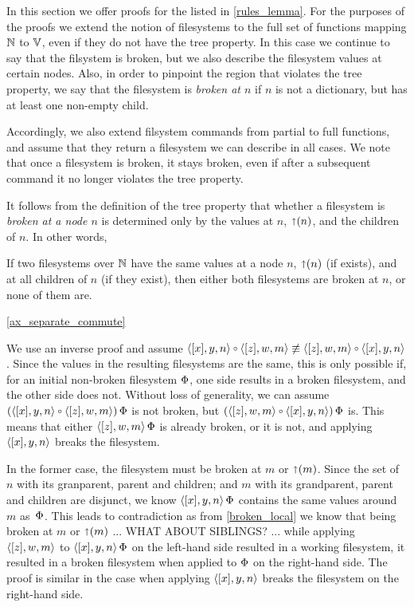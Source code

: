 
In this section we offer proofs for the  listed in
\cref{rules_lemma}.
For the purposes of the proofs we extend the notion of filesystems 
to the full set of functions mapping $\mathbb{N}$ to $\mathbb{V}$, even if they
do not have the tree property.
In this case we continue to say that the filsystem is broken,
but we also describe the filesystem values at certain nodes.
Also, in order to pinpoint the region that violates the tree property,
we say that the filesystem is \emph{broken at $n$} if 
$n$ is not a dictionary, but has at least one non-empty child.

Accordingly, we also extend filsystem commands from partial to full functions,
and assume that they return a filesystem we can describe in all cases.
We note that once a filesystem is broken, it stays broken, even if
after a subsequent command it no longer violates the tree property.

It follows from the definition of the tree property that
whether a filesystem is \emph{broken at a node $n$} is determined only
by the values at $n$, $\mathord{\shortuparrow}({n})$, and the children of $n$.
In other words,

\begin{myclm}
If two filesystems over $\mathbb{N}$ have the same values at a node $n$,
$\mathord{\shortuparrow}({n})$ (if exists), and at all children of $n$ (if they exist),
then either both filesystems are broken at $n$, or none of them are.
\end{myclm}

\cref{ax_separate_commute}

We use an inverse proof and assume $\cxynv\cc\czwmv \nequiv \czwmv\cc\cxynv$.
Since the values in the resulting filesystems are the same,
this is only possible if, for an initial non-broken filesystem $\Phi$,
one side results in a broken filesystem, and the other side does not.
Without loss of generality, we can assume
$(\cxynv\cc\czwmv)\aFS$ is not broken, but $(\czwmv\cc\cxynv)\aFS$ is.
This means that either $\langle{[z],w,m}\rangle\,\Phi$ is already broken, or it is not, and applying $\langle{[x],y,n}\rangle$
breaks the filesystem.

In the former case, the filesystem must be broken at $m$ or $\mathord{\shortuparrow}({m})$.
Since the set of $n$ with its granparent, parent and children; and $m$ with its grandparent, parent and children
are disjunct, we know $\langle{[x],y,n}\rangle\,\Phi$ contains the same values around $m$ as $\,\Phi$.
This leads to contradiction as from \cref{broken_local} we know
that being broken at $m$ or $\mathord{\shortuparrow}({m})$
... WHAT ABOUT SIBLINGS? ...
while applying $\langle{[z],w,m}\rangle$ to $\langle{[x],y,n}\rangle\,\Phi$ on the left-hand side resulted in a working filesystem,
it resulted in a broken filesystem when applied to $\Phi$ on the right-hand side.
The proof is similar in the case when applying $\langle{[x],y,n}\rangle$ breaks the filesystem on the right-hand side.

